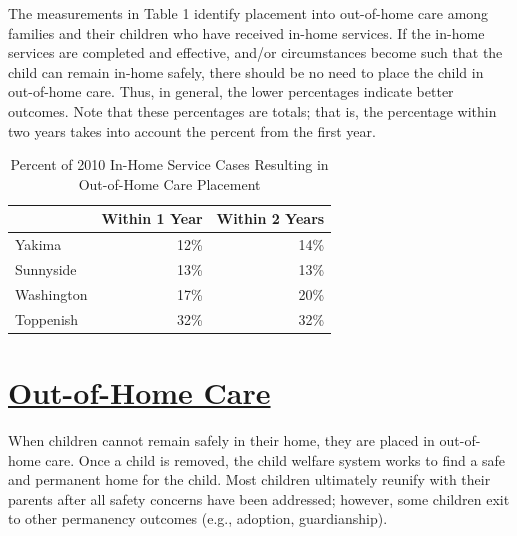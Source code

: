\documentclass{article}\usepackage[]{graphicx}\usepackage[]{color}
\begin{document}
The measurements in Table 1 identify placement into out-of-home care among families and their children who have received in-home services. If the in-home services are completed and effective, and/or circumstances become such that the child can remain in-home safely, there should be no need to place the child in out-of-home care. Thus, in general, the lower percentages indicate better outcomes. Note that these percentages are totals; that is, the percentage within two years takes into account the percent from the first year.
\vspace{12pt}
\begin{table}[ht]
\centering
\caption{Percent of 2010 In-Home Service Cases Resulting in Out-of-Home Care Placement} 
\begin{tabular}{lrr}
  \toprule
 & Within 1 Year & Within 2 Years \\ 
  \midrule
Yakima & 12\% & 14\% \\ 
  Sunnyside & 13\% & 13\% \\ 
  Washington & 17\% & 20\% \\ 
  Toppenish & 32\% & 32\% \\ 
   \bottomrule
\end{tabular}
\end{table}



\newpage
\section{\href{http://www.partnersforourchildren.org/child-well-being/visualizations/out-home-care/trends}
    {Out-of-Home Care}
}
When children cannot remain safely in their home, they are placed in out-of-home care. Once a child is removed, the child welfare system works to find a safe and permanent home for the child. Most children ultimately reunify with their parents after all safety concerns have been addressed; however, some children exit to other permanency outcomes (e.g., adoption, guardianship).\\[6pt]

\label{p:ooh}
\end{document}
